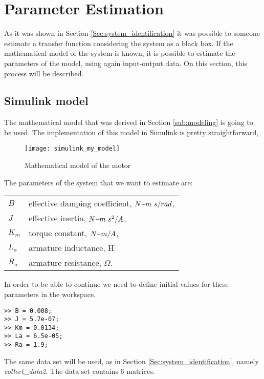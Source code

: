 \newcommand{\minus}{\scalebox{0.75}[1.0]{$-$}}


\section{Parameter Estimation}
	
As it was shown in Section \ref{Sec:system_identification} it was possible to someone estimate a transfer function considering the system as a black box. If the mathematical model of the system is known, it is possible to estimate the parameters of the model, using again input-output data. On this section, this process will be described.


\subsection{Simulink model}

The mathematical model that was derived in Section \ref{sub:modeling} is going to be used. The implementation of this model in Simulink is pretty straightforward,

\begin{figure}[h!]
	\texttt{[image: simulink\_my\_model]}
	\caption{Mathematical model of the motor}
	\label{Fig:model_ss}
\end{figure}

The parameters of the system that we want to estimate are:

\begin{tabular}{l l}
	$B$ 		& effective damping coefficient, $N \minus m \ s/rad$,\\
	$J$ 		& effective inertia, $N \minus m \ s^2/A$, \\
	$K_m$	& torque constant, $N \minus m/A$, \\
	$L_a$	& armature inductance, H \\
	$R_a$	& armature resistance, $\Omega$.
\end{tabular}

\noindent In order to be able to continue we need to define initial values for these parameters in the workspace.

\begin{lstlisting}[style=My_MATLAB]
>> B = 0.008;
>> J = 5.7e-07;
>> Km = 0.0134;
>> La = 6.5e-05;
>> Ra = 1.9;
\end{lstlisting}

The same data set will be used, as in Section \ref{Sec:system_identification}, namely \textit{collect\_data2}. The data set contains 6 matrices.

